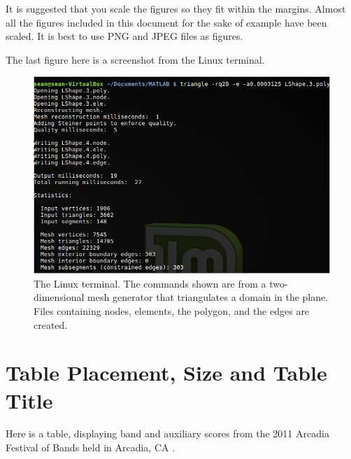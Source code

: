 It is suggested that you scale the figures so they fit within the margins. Almost all the figures included in this document for the sake of example have been scaled. It is best to use PNG and JPEG files as figures.

The last figure here is a screenshot from the Linux terminal.

\begin{figure}[H]
	\centering
	\includegraphics[width=4.75in]{images/Terminal1.png}
	\caption{The Linux terminal. The commands shown are from a two-dimensional mesh generator that triangulates a domain in the plane. Files containing nodes, elements, the polygon, and the edges are created.}
\end{figure}

\section{Table Placement, Size and Table Title}

Here is a table, displaying band and auxiliary scores from the 2011 Arcadia Festival of Bands held in Arcadia, CA \cite{ARCADIA}.


